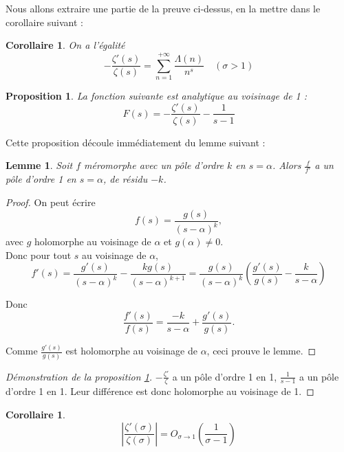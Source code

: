 \documentclass[french]{report}
\newtheorem{proposition}[theorem]{Proposition}
\newtheorem{corollary}[theorem]{Corollaire}
\newtheorem{lemma}[theorem]{Lemme}
\begin{document}
Nous allons extraire une partie de la preuve ci-dessus, en la mettre dans le corollaire suivant :

\begin{corollary}\label{cor:zeta-zeta-prime-van-mangoldt}
  On a l'égalité
  \[ -\frac{\zeta'(s)}{\zeta(s)} = \sum_{n=1}^{+\infty}\frac{\Lambda(n)}{n^s}\quad(\sigma>1) \]
\end{corollary}

\begin{proposition}\label{prop:zeta-sur-zeta-prime-1-sur-holomorphe}
  La fonction suivante est analytique au voisinage de 1 :
  \[ F(s) = - \frac{\zeta'(s)}{\zeta(s)} - \frac{1}{s-1} \]
\end{proposition}

Cette proposition découle immédiatement du lemme suivant :

\begin{lemma}
  Soit $f$ méromorphe avec un pôle d'ordre $k$ en $s=\alpha$. Alors $\frac{f}{f'}$ a un pôle d'ordre 1 en $s=\alpha$, de résidu $-k$.
\end{lemma}

\begin{proof}
  On peut écrire
  \[ f(s) = \frac{g(s)}{(s-\alpha)^k},\]
  avec $g$ holomorphe au voisinage de $\alpha$ et $g(\alpha)\neq0$.
  \\

  Donc pour tout $s$ au voisinage de $\alpha$,
  \[
    f'(s)
    = \frac{g'(s)}{(s-\alpha)^k}-\frac{kg(s)}{(s-\alpha)^{k+1}}
    = \frac{g(s)}{(s-\alpha)^k}\left(\frac{g'(s)}{g(s)}-\frac{k}{s-\alpha}\right)
  \]

  Donc
  \[
    \frac{f'(s)}{f(s)} = \frac{-k}{s-\alpha}+\frac{g'(s)}{g(s)}.
  \]

  Comme $\frac{g'(s)}{g(s)}$ est holomorphe au voisinage de $\alpha$, ceci prouve le lemme.
\end{proof}

\begin{proof}[Démonstration de la proposition \ref{prop:zeta-sur-zeta-prime-1-sur-holomorphe}]
 $-\frac{\zeta'}{\zeta}$ a un pôle d'ordre 1 en 1, $\frac{1}{s-1}$ a un pôle d'ordre 1 en 1. Leur différence est donc holomorphe au voisinage de 1.
\end{proof}

\begin{corollary}\label{cor:zeta-sur-zeta-prime-o}
  \[ \left|\frac{\zeta'(\sigma)}{\zeta(\sigma)}\right| = O_{\sigma\to1}\left(\frac{1}{\sigma-1}\right) \]
\end{corollary}
\end{document}
